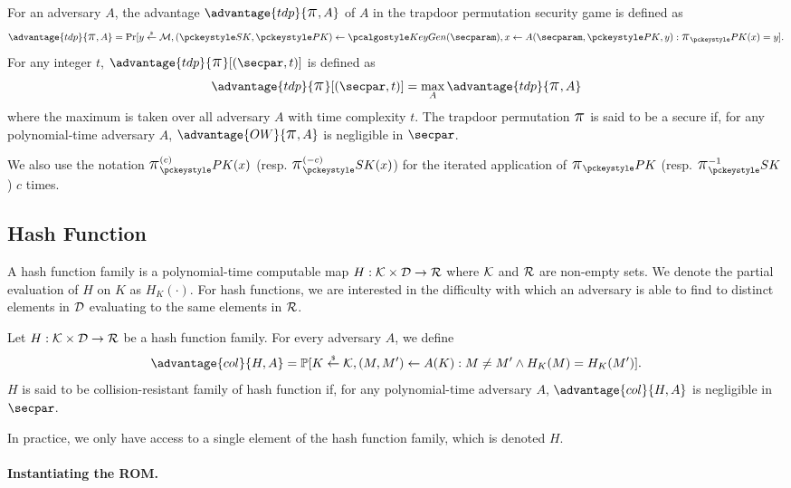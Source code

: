 \begin{definition}
	\label{def:tdp}
For an adversary $A$, the advantage $\advantage{tdp}{\lpi,A}$ of $A$ in the trapdoor permutation security game is defined as
\[
	\advantage{tdp}{\lpi,A} = \Pr[ y \getsr \cM, (\SK,\PK) \gets \KeyGen(\secparam), x \gets A(\secparam, \PK,y) : \lpi_\PK(x) = y ].
\]
For any integer $t$, $\advantage{tdp}{\lpi}[(\secpar, t)]$ is defined as
	\[
		\advantage{tdp}{\lpi}[(\secpar, t)] = \max_{A} \advantage{tdp}{\lpi, A}
	\]
	where the maximum is taken over all adversary $A$ with time complexity $t$.
The trapdoor permutation $\text{\Large{$\pi$}}$ is said to be a secure if, for any polynomial-time adversary $A$, $\advantage{OW}{\lpi,A}$ is negligible in $\secpar$.
\end{definition}

We also use the notation $\lpi^{(c)}_\PK(x)$ (resp. $\lpi^{(-c)}_\SK(x)$) for
the iterated application of $\lpi_\PK$ (resp. $\lpi^{-1}_\SK$) $c$ times.



\subsection{Hash Function} %
\label{sub:def_hash}

A hash function family is a polynomial-time computable map $H: \mathcal{K} \times \mathcal{D} \rightarrow \mathcal{R}$ where $\mathcal{K}$ and $\mathcal{R}$ are non-empty sets.
We denote the partial evaluation of $H$ on $K$ as $H_K(\cdot)$. 
For hash functions, we are interested in the difficulty with which an adversary is able to find to distinct elements in $\mathcal{D}$ evaluating to the same elements in $\mathcal{R}$.

\begin{definition}
	\label{def:hash_col}
	Let $H: \mathcal{K} \times \mathcal{D} \rightarrow \mathcal{R}$ be a hash function family.
	For every adversary $A$, we define
	\[
		\advantage{col}{H,A} = \Prob[K \getsr \cK, (M,M') \gets A(K) : M \neq M' \wedge H_K(M) = H_K(M')].
	\]
	$H$ is said to be collision-resistant family of hash function if, for any polynomial-time adversary $A$, $\advantage{col}{H,A}$ is negligible in $\secpar$.
\end{definition}
In practice, we only have access to a single element of the hash function family, which is denoted $H$.

\paragraph{Instantiating the ROM.} %
\label{par:rom_instantiation}

